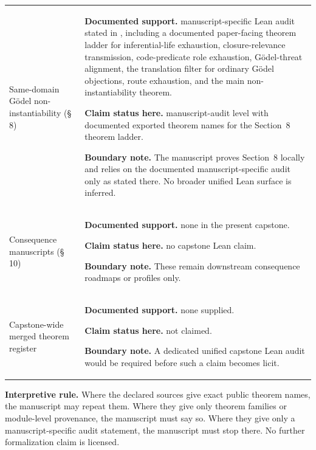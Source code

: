 {\begin{longtable}{P{0.24\textwidth}P{0.70\textwidth}}
Same-domain G\"odel non-instantiability (\S\,8) &
\textbf{Documented support.} manuscript-specific Lean audit stated in \noninstgodeldoc{}, including a documented paper-facing theorem ladder for inferential-life exhaustion, closure-relevance transmission, code-predicate role exhaustion, G\"odel-threat alignment, the translation filter for ordinary G\"odel objections, route exhaustion, and the main non-instantiability theorem.\par
\textbf{Claim status here.} manuscript-audit level with documented exported theorem names for the Section~8 theorem ladder.\par
\textbf{Boundary note.} The manuscript proves Section~8 locally and relies on the documented manuscript-specific audit only as stated there. No broader unified Lean surface is inferred. \\

Consequence manuscripts (\S\,10) &
\textbf{Documented support.} none in the present capstone.\par
\textbf{Claim status here.} no capstone Lean claim.\par
\textbf{Boundary note.} These remain downstream consequence roadmaps or profiles only. \\

Capstone-wide merged theorem register &
\textbf{Documented support.} none supplied.\par
\textbf{Claim status here.} not claimed.\par
\textbf{Boundary note.} A dedicated unified capstone Lean audit would be required before such a claim becomes licit. \\
\end{longtable}
}

\begin{reviewbox}
\textbf{Interpretive rule.} Where the declared sources give exact public theorem names, the manuscript may repeat them. Where they give only theorem families or module-level provenance, the manuscript must say so. Where they give only a manuscript-specific audit statement, the manuscript must stop there. No further formalization claim is licensed.
\end{reviewbox}
